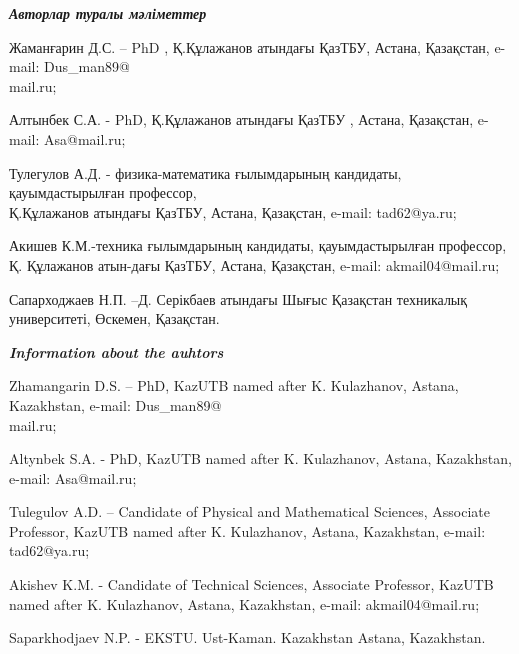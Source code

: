 \emph{{\bfseries Авторлар туралы мәліметтер}}
\begin{noparindent}

Жаманғарин Д.С. -- PhD , Қ.Құлажанов атындағы ҚазТБУ, Астана, Қазақстан,
e-mail: Dus\_man89@\\mail.ru;

Алтынбек С.А. - PhD, Қ.Құлажанов атындағы ҚазТБУ , Астана, Қазақстан,
e-mail: Asa@mail.ru;

Тулегулов А.Д. - физика-математика ғылымдарының кандидаты,
қауымдастырылған профессор,\\Қ.Құлажанов атындағы ҚазТБУ, Астана,
Қазақстан, e-mail: tad62@ya.ru;

Акишев К.М.-техника ғылымдарының кандидаты, қауымдастырылған профессор,
Қ. Құлажанов атын-дағы ҚазТБУ, Астана, Қазақстан, e-mail:
akmail04@mail.ru;

Сапарходжаев Н.П. --Д. Серікбаев атындағы Шығыс Қазақстан техникалық
университеті, Өскемен, Қазақстан.
\end{noparindent}

\emph{{\bfseries Information about the auhtors}}
\begin{noparindent}

Zhamangarin D.S. -- PhD, KazUTB named after K. Kulazhanov, Astana,
Kazakhstan, e-mail: Dus\_man89@\\mail.ru;

Altynbek S.A. - PhD, KazUTB named after K. Kulazhanov, Astana,
Kazakhstan, e-mail: Asa@mail.ru;

Tulegulov A.D. -- Candidate of Physical and Mathematical Sciences,
Associate Professor, KazUTB named after K. Kulazhanov, Astana,
Kazakhstan, e-mail: tad62@ya.ru;

Akishev K.M. - Candidate of Technical Sciences, Associate Professor,
KazUTB named after K. Kulazhanov, Astana, Kazakhstan, e-mail:
akmail04@mail.ru;

Saparkhodjaev N.P. - EKSTU. Ust-Kaman. Kazakhstan Astana, Kazakhstan.
\end{noparindent}


